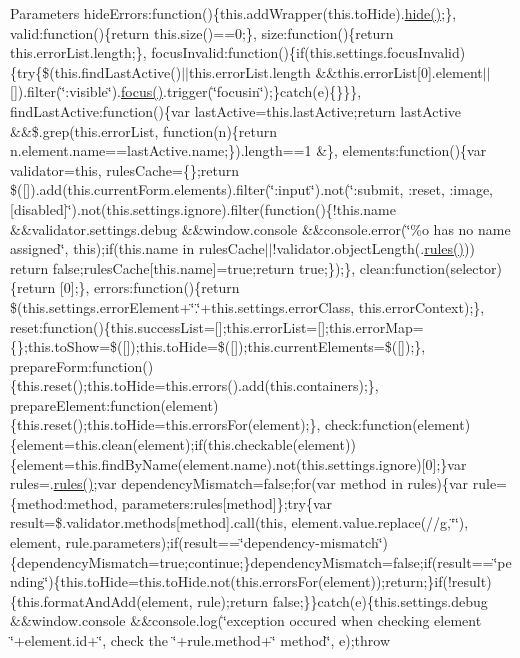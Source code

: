 \begin{DoxyParams}{Parameters}
hide\+Errors\+:function()\{this.\+add\+Wrapper(this.\+to\+Hide).\hyperlink{jquery-1_810_82-vsdoc_8js_ab184a969b4c8542290dae744d90fd4d2}{hide()};\}, valid\+:function()\{return this.\+size()==0;\}, size\+:function()\{return this.\+error\+List.\+length;\}, focus\+Invalid\+:function()\{if(this.\+settings.\+focus\+Invalid)\{try\{\$(this.\+find\+Last\+Active()$\vert$$\vert$this.error\+List.\+length \&\&this.\+error\+List\mbox{[}0\mbox{]}.element$\vert$$\vert$\mbox{[}\mbox{]}).filter(\char`\"{}\+:visible\char`\"{}).\hyperlink{jquery-1_810_82-vsdoc_8js_a2bab6fb1fd05f2802566c86887bdc7a2}{focus()}.trigger(\char`\"{}focusin\char`\"{});\}catch(e)\{\}\}\}, find\+Last\+Active\+:function()\{var last\+Active=this.\+last\+Active;return last\+Active \&\&\$.grep(this.\+error\+List, function(n)\{return n.\+element.\+name==last\+Active.\+name;\}).length==1 \&\}, elements\+:function()\{var validator=this, rules\+Cache=\{\};return \$(\mbox{[}\mbox{]}).add(this.\+current\+Form.\+elements).filter(\char`\"{}\+:input\char`\"{}).not(\char`\"{}\+:submit, \+:reset, \+:image, \mbox{[}disabled\mbox{]}\char`\"{}).not(this.\+settings.\+ignore).filter(function()\{!this.name \&\&validator.\+settings.\+debug \&\&window.\+console \&\&console.\+error(\char`\"{}\%o has no name assigned\char`\"{}, this);if(this.\+name in rules\+Cache$\vert$$\vert$!validator.object\+Length(.\hyperlink{_bibabook_2_scripts_2respond_8js_ada87c2e257bc5ff6e77cdbc23ed986a3}{rules()})) return false;rules\+Cache\mbox{[}this.\+name\mbox{]}=true;return true;\});\}, clean\+:function(selector)\{return \mbox{[}0\mbox{]};\}, errors\+:function()\{return \$(this.\+settings.\+error\+Element+\char`\"{}.\char`\"{}+this.settings.\+error\+Class, this.\+error\+Context);\}, reset\+:function()\{this.\+success\+List=\mbox{[}\mbox{]};this.\+error\+List=\mbox{[}\mbox{]};this.\+error\+Map=\{\};this.\+to\+Show=\$(\mbox{[}\mbox{]});this.\+to\+Hide=\$(\mbox{[}\mbox{]});this.\+current\+Elements=\$(\mbox{[}\mbox{]});\}, prepare\+Form\+:function()\{this.\+reset();this.\+to\+Hide=this.\+errors().add(this.\+containers);\}, prepare\+Element\+:function(element)\{this.\+reset();this.\+to\+Hide=this.\+errors\+For(element);\}, check\+:function(element)\{element=this.\+clean(element);if(this.\+checkable(element))\{element=this.\+find\+By\+Name(element.\+name).not(this.\+settings.\+ignore)\mbox{[}0\mbox{]};\}var rules=.\hyperlink{_bibabook_2_scripts_2respond_8js_ada87c2e257bc5ff6e77cdbc23ed986a3}{rules()};var dependency\+Mismatch=false;for(var method in rules)\{var rule=\{method\+:method, parameters\+:rules\mbox{[}method\mbox{]}\};try\{var result=\$.validator.\+methods\mbox{[}method\mbox{]}.call(this, element.\+value.\+replace(//g,\char`\"{}\char`\"{}), element, rule.\+parameters);if(result==\char`\"{}dependency-\/mismatch\char`\"{})\{dependency\+Mismatch=true;continue;\}dependency\+Mismatch=false;if(result==\char`\"{}pending\char`\"{})\{this.\+to\+Hide=this.\+to\+Hide.\+not(this.\+errors\+For(element));return;\}if(!result)\{this.\+format\+And\+Add(element, rule);return false;\}\}catch(e)\{this.\+settings.\+debug \&\&window.\+console \&\&console.\+log(\char`\"{}exception occured when checking element \char`\"{}+element.id+\char`\"{}, check the \textquotesingle{}\char`\"{}+rule.method+\char`\"{}\textquotesingle{} method\char`\"{}, e);throw 
\end{DoxyParams}
